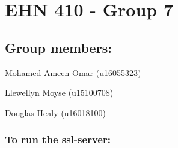 

 \section*{E\+HN 410 -\/ Group 7}



 \subsection*{Group members\+:}


\begin{DoxyItemize}
\item Mohamed Ameen Omar (u16055323)
\item Llewellyn Moyse (u15100708)
\item Douglas Healy (u16018100)
\end{DoxyItemize}



 \subsubsection*{To run the ssl-\/server\+:}




